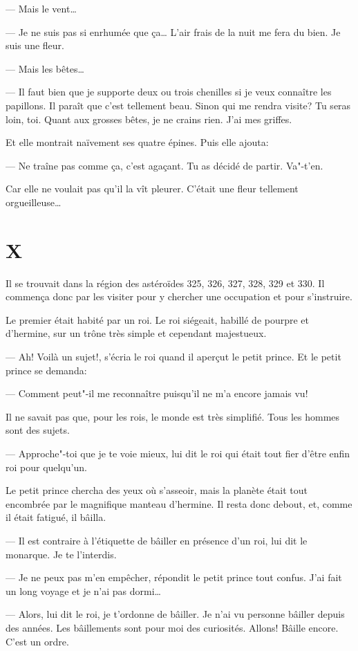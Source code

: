 \begin{Parallel}[p]{}{}
{--- Mais le vent\ldots{}

--- Je ne suis pas si enrhumée que ça\ldots{} L'air frais
de la nuit me fera du bien. Je suis une fleur.

--- Mais les bêtes\ldots{}

--- Il faut bien que je supporte deux ou trois chenilles si je veux connaître les papillons. Il paraît que
c'est tellement beau. Sinon qui me rendra visite? Tu
seras loin, toi. Quant aux grosses bêtes, je ne crains
rien. J'ai mes griffes.

Et elle montrait naïvement ses quatre épines. Puis
elle ajouta:

--- Ne traîne pas comme ça, c'est agaçant. Tu as
décidé de partir. Va"-t'en.

Car elle ne voulait pas qu'il la vît pleurer. C'était
une fleur tellement orgueilleuse\ldots{}

\section{X}

Il se trouvait dans la région des astéroïdes 325,
326, 327, 328, 329 et 330. Il commença donc par les
visiter pour y chercher une occupation et pour s'instruire.

Le premier était habité par un roi. Le roi siégeait,
habillé de pourpre et d'hermine, sur un trône très
simple et cependant majestueux.

--- Ah! Voilà un sujet!, s'écria le roi quand il aperçut le petit prince. Et le petit prince se demanda:

--- Comment peut"-il me reconnaître puisqu'il ne
m'a encore jamais vu!

Il ne savait pas que, pour les rois, le monde est
très simplifié. Tous les hommes sont des sujets.

--- Approche"-toi que je te voie mieux, lui dit le
roi qui était tout fier d'être enfin roi pour quelqu'un.

Le petit prince chercha des yeux où s'asseoir, mais
la planète était tout encombrée par le magnifique
manteau d'hermine. Il resta donc debout, et,
comme il était fatigué, il bâilla.

--- Il est contraire à l'étiquette de bâiller en présence d'un roi, lui dit le monarque. Je te l'interdis.

--- Je ne peux pas m'en empêcher, répondit le
petit prince tout confus. J'ai fait un long voyage et je
n'ai pas dormi\ldots{}

--- Alors, lui dit le roi, je t'ordonne de bâiller. Je n'ai vu personne bâiller depuis des années. Les
bâillements sont pour moi des curiosités. Allons! Bâille encore. C'est un ordre.

}
\end{Parallel}
